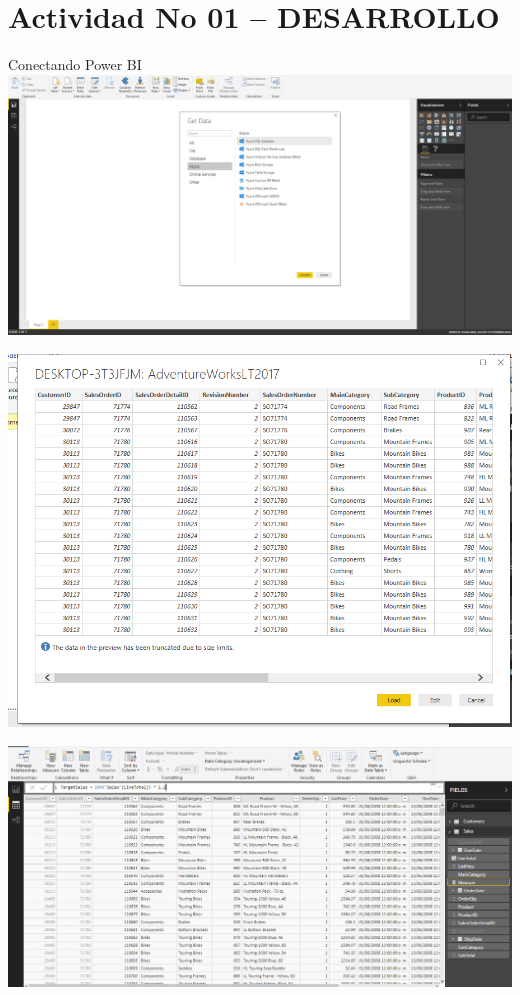  \section{Actividad No 01 – DESARROLLO} 
Conectando Power BI \\
	
	\includegraphics[width=15cm]{./Imagenes/11.png} 

	\includegraphics[width=15cm]{./Imagenes/12.png}

	\includegraphics[width=15cm]{./Imagenes/13.png}

